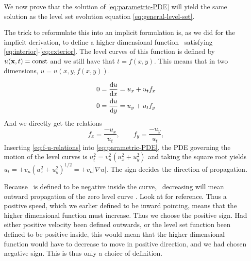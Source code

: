 We now prove that the solution of \eqref{eq:parametric-PDE} will yield the same solution as the level set evolution equation \eqref{eq:general-level-set}. 

The trick to reformulate this into an implicit formulation is, as we did for the implicit derivation, to define a higher dimensional function \uxt\ satisfying \eqref{eq:interior}-\eqref{eq:exterior}. The level curves of this function is defined by $u(\mathbf{x}, t)=\text{const}$ and we still have that $t=f(x, y)$. This means that in two dimensions, $u = u(x, y, f(x, y))$.

\begin{align*}
    0 &= \frac{\mathop{}\!\mathrm{d} u}{\mathop{}\!\mathrm{d} x} = u_x+u_t f_x \\
    0 &= \frac{\mathop{}\!\mathrm{d} u}{\mathop{}\!\mathrm{d} y} = u_y+u_t f_y
\end{align*}
 And we directly get the relations
\begin{equation}
    f_x = \frac{-u_x}{u_t}, \qquad f_y = \frac{-u_y}{u_t},
    \label{eq:f-u-relations}
\end{equation}
Inserting \eqref{eq:f-u-relations} into \eqref{eq:parametric-PDE}, the PDE governing the motion of the level curves is $u_t^2=v_n^2(u_x^2+u_y^2)$ and taking the square root yields $u_t = \pm v_n(u_x^2+u_y^2)^{1/2} = \pm v_n |\nabla u|$. The sign decides the direction of propagation. 

Because \uxt\ is defined to be negative inside the curve, \uxt\ decreasing will mean outward propagation of the zero level curve \curve. Look at  for reference. Thus a positive speed, which we earlier defined to be inward pointing, means that the higher dimensional function must increase. Thus we choose the positive sign. Had either positive velocity been defined outwards, or the level set function been defined to be positive inside, this would mean that the higher dimensional function would have to decrease to move in positive direction, and we had chosen negative sign. This is thus only a choice of definition.

